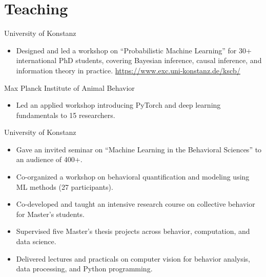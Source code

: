 \documentclass[10pt,a4paper]{article}
\begin{document}
\section*{Teaching}
University of Konstanz\par
\begin{itemize}
\item Designed and led a workshop on “Probabilistic Machine Learning” for 30+ international PhD students, covering Bayesian inference, causal inference, and information theory in practice. \href{https://www.exc.uni-konstanz.de/kscb/}{https://www.exc.uni-konstanz.de/kscb/}
\end{itemize}
Max Planck Institute of Animal Behavior\par
\begin{itemize}
\item Led an applied workshop introducing PyTorch and deep learning fundamentals to 15 researchers.
\end{itemize}
University of Konstanz\par
\begin{itemize}
\item Gave an invited seminar on “Machine Learning in the Behavioral Sciences” to an audience of 400+.
\item Co-organized a workshop on behavioral quantification and modeling using ML methods (27 participants).
\end{itemize}
\begin{itemize}
\item Co-developed and taught an intensive research course on collective behavior for Master’s students.
\item Supervised five Master’s thesis projects across behavior, computation, and data science.
\item Delivered lectures and practicals on computer vision for behavior analysis, data processing, and Python programming.
\end{itemize}
\end{document}
